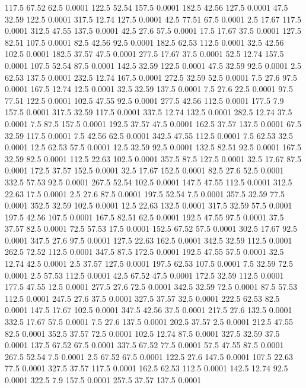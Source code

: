 117.5	67.52	62.5	0.0001
122.5	52.54	157.5	0.0001
182.5	42.56	127.5	0.0001
47.5	32.59	122.5	0.0001
317.5	12.74	127.5	0.0001
42.5	77.51	67.5	0.0001
2.5	17.67	117.5	0.0001
312.5	47.55	137.5	0.0001
42.5	27.6	57.5	0.0001
17.5	17.67	37.5	0.0001
127.5	82.51	107.5	0.0001
82.5	42.56	92.5	0.0001
182.5	62.53	112.5	0.0001
32.5	42.56	102.5	0.0001
182.5	37.57	47.5	0.0001
277.5	17.67	37.5	0.0001
52.5	12.74	157.5	0.0001
107.5	52.54	87.5	0.0001
142.5	32.59	122.5	0.0001
47.5	32.59	92.5	0.0001
2.5	62.53	137.5	0.0001
232.5	12.74	167.5	0.0001
272.5	32.59	52.5	0.0001
7.5	27.6	97.5	0.0001
167.5	12.74	12.5	0.0001
32.5	32.59	137.5	0.0001
7.5	27.6	22.5	0.0001
97.5	77.51	122.5	0.0001
102.5	47.55	92.5	0.0001
277.5	42.56	112.5	0.0001
177.5	7.9	157.5	0.0001
317.5	32.59	117.5	0.0001
337.5	12.74	132.5	0.0001
282.5	12.74	37.5	0.0001
7.5	87.5	157.5	0.0001
192.5	37.57	47.5	0.0001
162.5	37.57	137.5	0.0001
67.5	32.59	117.5	0.0001
7.5	42.56	62.5	0.0001
342.5	47.55	112.5	0.0001
7.5	62.53	32.5	0.0001
12.5	62.53	57.5	0.0001
12.5	32.59	92.5	0.0001
132.5	82.51	92.5	0.0001
167.5	32.59	82.5	0.0001
112.5	22.63	102.5	0.0001
357.5	87.5	127.5	0.0001
32.5	17.67	87.5	0.0001
172.5	37.57	152.5	0.0001
32.5	17.67	152.5	0.0001
82.5	27.6	52.5	0.0001
332.5	57.53	92.5	0.0001
267.5	52.54	102.5	0.0001
147.5	47.55	112.5	0.0001
312.5	22.63	17.5	0.0001
2.5	27.6	87.5	0.0001
197.5	52.54	7.5	0.0001
357.5	32.59	77.5	0.0001
352.5	32.59	102.5	0.0001
12.5	22.63	132.5	0.0001
317.5	32.59	57.5	0.0001
197.5	42.56	107.5	0.0001
167.5	82.51	62.5	0.0001
192.5	47.55	97.5	0.0001
37.5	37.57	82.5	0.0001
72.5	57.53	17.5	0.0001
152.5	67.52	57.5	0.0001
302.5	17.67	92.5	0.0001
347.5	27.6	97.5	0.0001
127.5	22.63	162.5	0.0001
342.5	32.59	112.5	0.0001
262.5	72.52	112.5	0.0001
347.5	87.5	172.5	0.0001
192.5	47.55	57.5	0.0001
32.5	12.74	42.5	0.0001
2.5	37.57	127.5	0.0001
197.5	62.53	107.5	0.0001
7.5	32.59	72.5	0.0001
2.5	57.53	112.5	0.0001
42.5	67.52	47.5	0.0001
172.5	32.59	112.5	0.0001
177.5	47.55	12.5	0.0001
277.5	27.6	72.5	0.0001
342.5	32.59	72.5	0.0001
87.5	57.53	112.5	0.0001
247.5	27.6	37.5	0.0001
327.5	37.57	32.5	0.0001
222.5	62.53	82.5	0.0001
147.5	17.67	102.5	0.0001
347.5	42.56	37.5	0.0001
217.5	27.6	132.5	0.0001
332.5	17.67	57.5	0.0001
7.5	27.6	137.5	0.0001
202.5	37.57	2.5	0.0001
212.5	47.55	82.5	0.0001
352.5	37.57	72.5	0.0001
102.5	12.74	87.5	0.0001
327.5	32.59	37.5	0.0001
137.5	67.52	67.5	0.0001
337.5	67.52	77.5	0.0001
57.5	47.55	87.5	0.0001
267.5	52.54	7.5	0.0001
2.5	67.52	67.5	0.0001
122.5	27.6	147.5	0.0001
107.5	22.63	77.5	0.0001
327.5	37.57	117.5	0.0001
162.5	62.53	112.5	0.0001
142.5	12.74	92.5	0.0001
322.5	7.9	157.5	0.0001
257.5	37.57	137.5	0.0001
